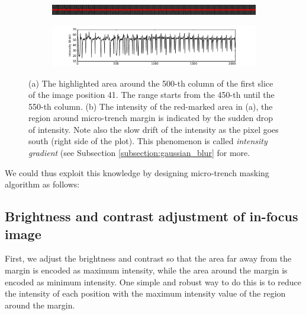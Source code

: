 \documentclass[pdftex,12pt,a4paper]{report}
\begin{document}
\begin{figure}[H]
\centering

\begin{subfigure}{0.8\textwidth}
  \centering
  \includegraphics[width=\textwidth]{images/pos_41_cut_highlight_y_500}
  \caption{}
  \label{fig:pos41_highlight}
\end{subfigure}%

\begin{subfigure}{\textwidth}
  \centering
  \includegraphics[width=\textwidth]{images/pos_41_cut_highlight_y_500_contrast}
  \caption{}
  \label{fig:pos41_contrast}
\end{subfigure}%
\caption[Example of intensity values along the vertical axis in an out-of-focus image]{(a) The highlighted area around the 500-th column of the first slice of the image position 41. The range starts from the 450-th until the 550-th column. (b) The intensity of the red-marked area in (a), the region around micro-trench margin is indicated by the sudden drop of intensity. Note also the slow drift of the intensity as the pixel goes south (right side of the plot). This phenomenon is called \textit{intensity gradient} (see Subsection \ref{subsection:gaussian_blur} for more.}
\label{fig:pos41_brightness}
\end{figure}

We could thus exploit this knowledge by designing micro-trench masking algorithm as follows:

\subsection{Brightness and contrast adjustment of in-focus image}
\label{subsubsection:brightness_contrast_adjustment}

First, we adjust the brightness and contrast so that the area far away from the margin is encoded as maximum intensity, while the area around the margin is encoded as minimum intensity. One simple and robust way to do this is to reduce the intensity of each position with the maximum intensity value of the region around the margin.
\end{document}
